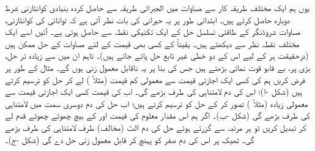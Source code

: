 یوں ہم ایک مختلف طریقہ کار سے مساوات  میں الجبرائی طریقہ سے حاصل کردہ بنیادی کوانٹازنی شرط دوبارہ حاصل کرتے ہیں۔ ابتدائی طور پر یہ حیرانی کی بات نظر آتی ہے کہ توانائی کی کوانٹازنی، مساوات شروڈنگر کے طاقتی تسلسل حل کے ایک تکنیکی نقطہ سے حاصل ہوتی ہے۔ آئیں اسے ایک مختلف نقطہ نظر سے دیکھتے ہیں۔ یقیناً  کے کسی بھی قیمت کے لئے مساوات  کے حل ممکن ہیں (درحقیقت ہر  کے لیے اس کے دو خطی غیر تابع حل پائے جاتے ہیں)۔ تاہم ان میں سے زیادہ تر حل، بڑی  پر، بے قابو قوت نمائی بڑھتے ہیں جس کی بنا پر یہ ناقابل  معمول زنی ہوں گے۔ مثال کے طور پر فرض کریں ہم  کی کسی ایک اجازتی قیمت سے معمولی کم قیمت (مثلاً ) لے کر حل کو ترسیم کرتے ہیں (شکل -ا)؛ اس کی دم لامتناہی کی طرف بڑھے گی۔ اب  کی قیمت کسی ایک اجازتی قیمت سے معمولی زیادہ (مثلاً ) تصور کر کے حل کو ترسیم کرتے ہیں؛ اب حل کی دم دوسری سمت میں لامتناہی کی طرف
 بڑھے گی (شکل -ب)۔ اگر ہم اس مقدار معلوم کی قیمت  اور  کے بیچ چھوٹے چھوٹے قدم لے کر تبدیل کریں تو ہر مرتبہ  سے گزرتے ہوئے حل کی دم الٹ (مخالف) طرف لامتناہی کی طرف بڑھے گی۔ ٹھیک  پر اس کی دم صفر کو پہنچ کر قابل  معمول زنی   حل دے گی (شکل -ج)۔ 

\begin{comment}
the tail flipping figure (Fig 2.6, p67 below) is produced with the octave code (./tex/octave/tailFlipping.m) reproduced below. this code named "tailFlipping.m" produces the data "tailFlipUP.dat" , "tailFlipDN.dat" and "tailFlipNone.dat" which must be placed in the folder "./tex/tables" (as set by "\pgfplotsset{table/search path={./tex/tables},}" in the preamble). Octave must be run independantly to produce this data.

"./tex/octave/tailFlipping.m"
{
vdp = @(t,y) [y(2); (t^2-0.98)*y(1)];
lin=linspace(0,3.75,50);
[t,y] = ode45 (fvdp, lin, [1,0]);
plot(t,y(:,1));

ty=[t,y(:,1)];
save tailFlipUP.dat ty

fvdp = @(t,y) [y(2); (t^2-1.02)*y(1)];
lin=linspace(0,3.75,50);
[t,y] = ode45 (fvdp, lin, [1,0]);
plot(t,y(:,1));

ty=[t,y(:,1)];
save tailFlipDn.dat ty

fvdp = @(t,y) [y(2); (t^2-1)*y(1)];
lin=linspace(0,3.75,50);
[t,y] = ode45 (fvdp, lin, [1,0]);
plot(t,y(:,1));

ty=[t,y(:,1)];
save tailFlipNone.dat ty
}
\end{comment}

